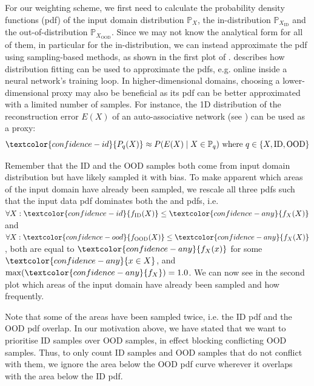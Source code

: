 \begin{multicols}{2}
    \noindent For our weighting scheme, we first need to calculate the probability density functions (pdf) of the \textcolor{confidence-any}{input domain distribution $\mathbb{P}_X$}, the \textcolor{confidence-id}{in-distribution $\mathbb{P}_{X_{\text{ID}}}$} and the \textcolor{confidence-ood}{out-of-distribution $\mathbb{P}_{X_{\text{OOD}}}$}. Since we may not know the analytical form for all of them, in particular for the \textcolor{confidence-id}{in-distribution}, we can instead approximate the pdf using sampling-based methods, as shown in the first plot of .  describes how distribution fitting can be used to approximate the pdfs, e.g. online inside a neural network's training loop. In higher-dimensional domains, choosing a lower-dimensional proxy may also be beneficial as its pdf can be better approximated with a limited number of samples. For instance, the 1D distribution of the reconstruction error $E(X)$ of an auto-associative network (see ) can be used as a proxy:
    \begin{equation*}
        \textcolor{confidence-id}{P_{q}(X)} \approx P(E(X) \given X \in \mathbb{P}_{q}) \text{ where } q \in \{ X, \text{ID}, \text{OOD} \}
    \end{equation*}

    \noindent Remember that the \textcolor{confidence-id}{ID} and the \textcolor{confidence-ood}{OOD} samples both come from \textcolor{confidence-any}{input domain distribution} but have likely sampled it with bias. To make apparent which areas of the \textcolor{confidence-any}{input domain} have already been sampled, we rescale all three pdfs such that the \textcolor{confidence-any}{input data pdf} dominates both the \textcolor{confidence-id}{} and \textcolor{confidence-ood}{} pdfs, i.e. $\forall X \st \textcolor{confidence-id}{f_{\text{ID}}(X)} \leq \textcolor{confidence-any}{f_{X}(X)}$ and $\forall X \st \textcolor{confidence-ood}{f_{\text{OOD}}(X)} \leq \textcolor{confidence-any}{f_{X}(X)}$, both are equal to $\textcolor{confidence-any}{f_{X}(x)}$ for some $\textcolor{confidence-any}{x \in X}$, and $\max(\textcolor{confidence-any}{f_{X}}) = 1.0$. We can now see in the second plot which areas of the \textcolor{confidence-any}{input domain} have already been sampled and how frequently.

    Note that some of the areas have been sampled twice, i.e. the \textcolor{confidence-id}{ID pdf} and the \textcolor{confidence-ood}{OOD pdf} overlap. In our motivation above, we have stated that we want to prioritise \textcolor{confidence-id}{ID} samples over \textcolor{confidence-ood}{OOD} samples, in effect blocking conflicting \textcolor{confidence-ood}{OOD} samples. Thus, to only count \textcolor{confidence-id}{ID samples} and \textcolor{confidence-ood}{OOD samples} that do not conflict with them, we ignore the area below the \textcolor{confidence-ood}{OOD pdf curve} wherever it overlaps with the area below the \textcolor{confidence-id}{ID pdf}.


\end{multicols}
